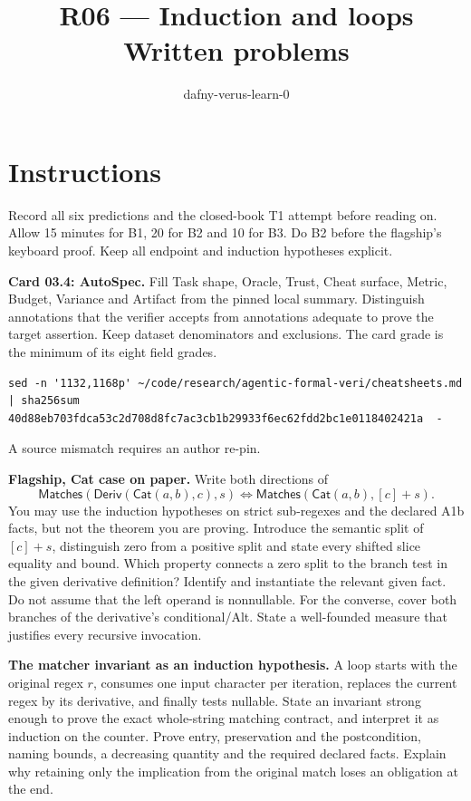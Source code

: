 \documentclass[11pt]{article}
\title{R06 --- Induction and loops \\ \large Written problems}
\author{dafny-verus-learn-0}
\date{}
\begin{document}
\maketitle
\section*{Instructions}
Record all six predictions and the closed-book T1 attempt before reading on.
Allow 15 minutes for B1, 20 for B2 and 10 for B3. Do B2 before the flagship's keyboard
proof. Keep all endpoint and induction hypotheses explicit.
\begin{problem}\label{prob:B1}
\textbf{Card 03.4: AutoSpec.} Fill Task shape, Oracle, Trust, Cheat surface,
Metric, Budget, Variance and Artifact from the pinned local summary. Distinguish
annotations that the verifier accepts from annotations adequate to prove the
target assertion. Keep dataset denominators and exclusions. The card grade is
the minimum of its eight field grades.
\begin{verbatim}
sed -n '1132,1168p' ~/code/research/agentic-formal-veri/cheatsheets.md | sha256sum
40d88eb703fdca53c2d708d8fc7ac3cb1b29933f6ec62fdd2bc1e0118402421a  -
\end{verbatim}
A source mismatch requires an author re-pin.
\end{problem}
\begin{problem}[proof]\label{prob:B2}
\textbf{Flagship, Cat case on paper.} Write both directions of
\[
 \mathsf{Matches}(\mathsf{Deriv}(\mathsf{Cat}(a,b),c),s)
 \Longleftrightarrow\mathsf{Matches}(\mathsf{Cat}(a,b),[c]+s).
\]
You may use the induction hypotheses on strict sub-regexes and the declared
A1b facts, but not the theorem you are proving. Introduce the semantic split
of $[c]+s$, distinguish zero from a positive split and state every shifted
slice equality and bound. Which property connects a zero split to the branch
test in the given derivative definition? Identify and instantiate the relevant
given fact. Do not assume that the left operand is nonnullable.
For the converse, cover both branches of the derivative's conditional/Alt.
State a well-founded measure that justifies every recursive invocation.
\end{problem}
\begin{problem}[proof]\label{prob:B3}
\textbf{The matcher invariant as an induction hypothesis.} A loop starts
with the original regex $r$, consumes one input character per iteration,
replaces the current regex by its derivative, and finally tests nullable.
State an invariant strong enough to prove the exact whole-string matching
contract, and interpret it as induction on the counter. Prove entry,
preservation and the postcondition, naming bounds, a decreasing quantity and
the required declared facts. Explain why retaining only the implication from
the original match loses an obligation at the end.
\end{problem}
\end{document}
